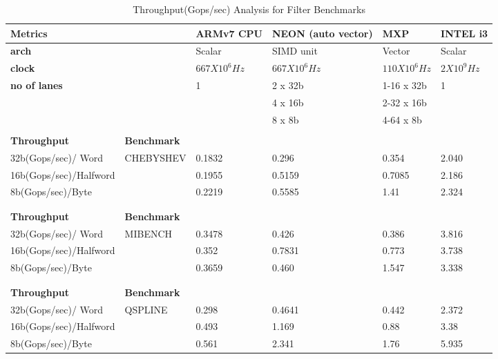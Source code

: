\begin{table}[htbp]
	\centering
		\begin{adjustbox}{width=1\textwidth}
		\small
	\begin{tabular}{llllll}
		\toprule
		\textbf{Metrics} &   & \textbf{ARMv7 CPU} & \textbf{NEON (auto vector)} & \textbf{MXP} & \textbf{INTEL i3} \\
		\midrule
		\textbf{arch} &   & Scalar & SIMD unit & Vector & Scalar \\
		\textbf{clock} &   & $667 X 10^{6}Hz$ & $667 X 10^{6}Hz$ & $110 X 10^{6}Hz$ & $2 X 10^{9}Hz$ \\
		\textbf{no of lanes} &   & 1 & 2 x 32b & 1-16 x 32b & 1 \\
		&   &   & 4 x 16b & 2-32 x 16b &  \\
		&   &   & 8 x 8b & 4-64 x 8b &  \\
		&   &   &   &   &  \\
		\midrule
		 \textbf{Throughput} & \textbf{Benchmark} &   &   &   &  \\
		\midrule
		 32b(Gops/sec)/ Word   & CHEBYSHEV & 0.1832 & 0.296 & 0.354 & 2.040 \\
	 16b(Gops/sec)/Halfword &   & 0.1955 & 0.5159 & 0.7085 & 2.186 \\
		 8b(Gops/sec)/Byte &   & 0.2219 & 0.5585 & 1.41 & 2.324 \\
		   &   &   &   &   &  \\
		   &   &   &   &   &  \\
		\midrule
		 \textbf{Throughput} & \textbf{Benchmark} &   &   &   &  \\
		\midrule
		 32b(Gops/sec)/ Word   & MIBENCH & 0.3478 & 0.426 & 0.386 & 3.816 \\
		 16b(Gops/sec)/Halfword &   & 0.352 & 0.7831 & 0.773 & 3.738 \\
		 8b(Gops/sec)/Byte &   & 0.3659 & 0.460 & 1.547 & 3.338 \\
		  &   &   &   &   &  \\
		   &   &   &   &   &  \\
		\midrule
	 \textbf{Throughput} & \textbf{Benchmark} &   &   &   &  \\
		\midrule
	 32b(Gops/sec)/ Word   & QSPLINE & 0.298 & 0.4641 & 0.442 & 2.372 \\
	16b(Gops/sec)/Halfword &   & 0.493 & 1.169 & 0.88 & 3.38 \\
		 8b(Gops/sec)/Byte &   & 0.561 & 2.341 & 1.76 & 5.935 \\
		\bottomrule
	\end{tabular}%
    \end{adjustbox}%

		\caption{Throughput(Gops/sec) Analysis for Filter Benchmarks}
		\label{poly:d}%
\end{table}%